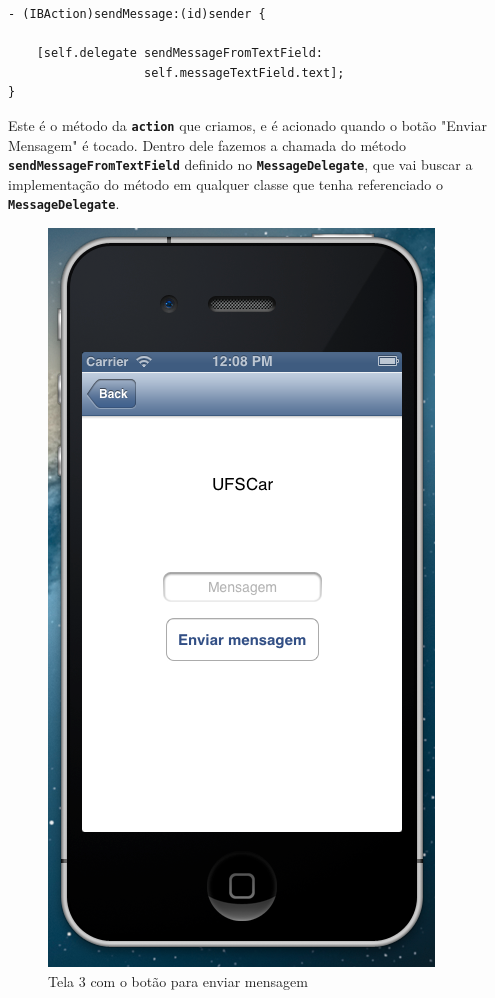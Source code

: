 \documentclass[a4paper,12pt,brazil,doubleside]{book}
\begin{document}
\begin{listing}
\begin{verbatim}
- (IBAction)sendMessage:(id)sender {
    
    [self.delegate sendMessageFromTextField:
                   self.messageTextField.text];
}
\end{verbatim}
\end{listing}

Este é o método da \texttt{\textbf{action}} que criamos, e é acionado quando o botão "Enviar Mensagem" é tocado. Dentro dele fazemos a chamada do método \texttt{\textbf{sendMessageFromTextField}} definido no \texttt{\textbf{MessageDelegate}}, que vai buscar a implementação do método em qualquer classe que tenha referenciado o \texttt{\textbf{MessageDelegate}}.

\pagebreak

\begin{figure}[h]
  \centering
  \includegraphics[totalheight=0.4\textheight]{figuras/3/simulador3_tela3.png}
  \caption{Tela 3 com o botão para enviar mensagem}
  \label{fig:a}
\end{figure}
\end{document}
